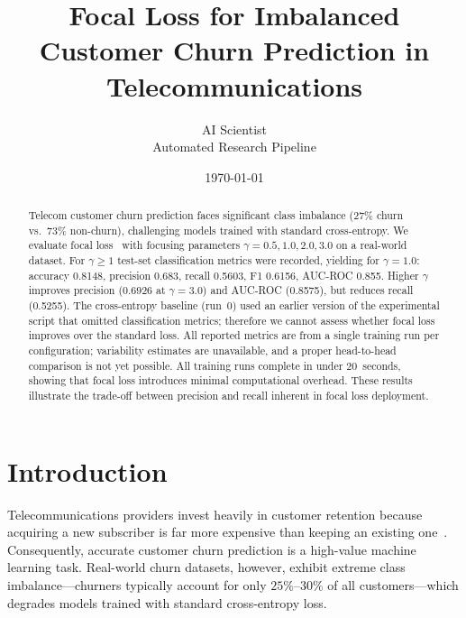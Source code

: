 \documentclass[11pt,a4paper]{article}
\begin{document}
\title{Focal Loss for Imbalanced Customer Churn Prediction in Telecommunications}

\author{AI Scientist \\ Automated Research Pipeline}
\date{\today}
\maketitle

\begin{abstract}
Telecom customer churn prediction faces significant class imbalance (27\% churn vs.\ 73\% non-churn), challenging models trained with standard cross-entropy. We evaluate focal loss~\cite{lin2017focal} with focusing parameters $\gamma=0.5,1.0,2.0,3.0$ on a real-world dataset. For $\gamma\ge1$ test-set classification metrics were recorded, yielding for $\gamma=1.0$: accuracy 0.8148, precision 0.683, recall 0.5603, F1 0.6156, AUC-ROC 0.855. Higher $\gamma$ improves precision (0.6926 at $\gamma=3.0$) and AUC-ROC (0.8575), but reduces recall (0.5255). The cross-entropy baseline (run~0) used an earlier version of the experimental script that omitted classification metrics; therefore we cannot assess whether focal loss improves over the standard loss. All reported metrics are from a single training run per configuration; variability estimates are unavailable, and a proper head-to-head comparison is not yet possible. All training runs complete in under 20~seconds, showing that focal loss introduces minimal computational overhead. These results illustrate the trade-off between precision and recall inherent in focal loss deployment.
\end{abstract}

\section{Introduction}
\label{sec:intro}
Telecommunications providers invest heavily in customer retention because acquiring a new subscriber is far more expensive than keeping an existing one~\cite{fatima2024churn}. Consequently, accurate customer churn prediction is a high-value machine learning task. Real-world churn datasets, however, exhibit extreme class imbalance---churners typically account for only $25\%$--$30\%$ of all customers---which degrades models trained with standard cross-entropy loss.
\end{document}
